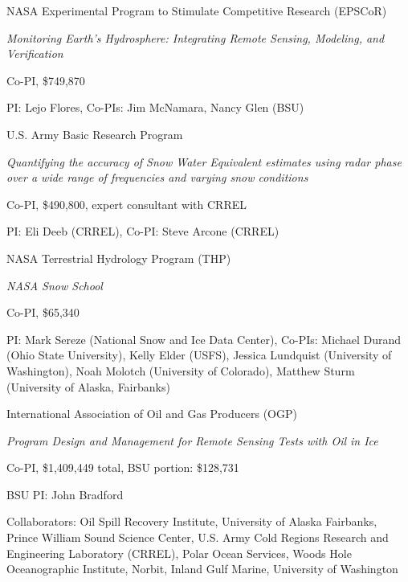 \documentclass[11pt]{article}
\renewenvironment{itemize}{
  \begin{list}{}{
    \setlength{\leftmargin}{1.5em}
    \setlength{\itemsep}{0pt}
    \setlength{\parskip}{0pt}
  }
}{
  \end{list}
}
\begin{document}
\begin{itemize}
\item[6/2014-6/2018] NASA Experimental Program to Stimulate Competitive Research (EPSCoR)
\begin{itemize}
\item \textit{Monitoring Earth's Hydrosphere: Integrating Remote Sensing, Modeling, and Verification}
\item Co-PI, \$749,870
\item PI: Lejo Flores, Co-PIs: Jim McNamara, Nancy Glen (BSU)
\end{itemize}

\item[10/2013-9/2016] U.S. Army Basic Research Program
\begin{itemize}
\item \textit{Quantifying the accuracy of Snow Water Equivalent estimates using radar phase over a wide range of frequencies and varying snow conditions}
\item Co-PI, \$490,800, expert consultant with CRREL
\item PI: Eli Deeb (CRREL), Co-PI: Steve Arcone (CRREL)
\end{itemize}

\item[1/2014-12/2014] NASA Terrestrial Hydrology Program (THP)
\begin{itemize}
\item \textit{NASA Snow School}
\item Co-PI, \$65,340
\item PI: Mark Sereze (National Snow and Ice Data Center), Co-PIs: Michael Durand (Ohio State University), Kelly Elder (USFS),
Jessica Lundquist (University of Washington), Noah Molotch (University of Colorado), Matthew Sturm (University of Alaska, Fairbanks)
\end{itemize}

\item[01/2014-12/2014] International Association of Oil and Gas Producers (OGP)
\begin{itemize}
\item \textit{Program Design and Management for Remote Sensing Tests with Oil in Ice}
\item Co-PI, \$1,409,449 total, BSU portion: \$128,731
\item BSU PI: John Bradford
\item Collaborators: Oil Spill Recovery Institute, University of Alaska Fairbanks, Prince William Sound Science Center, U.S. Army Cold Regions Research and Engineering Laboratory (CRREL), Polar Ocean Services, Woods Hole Oceanographic Institute, Norbit, Inland Gulf Marine, University of Washington
\end{itemize}


\end{itemize}
\end{document}
